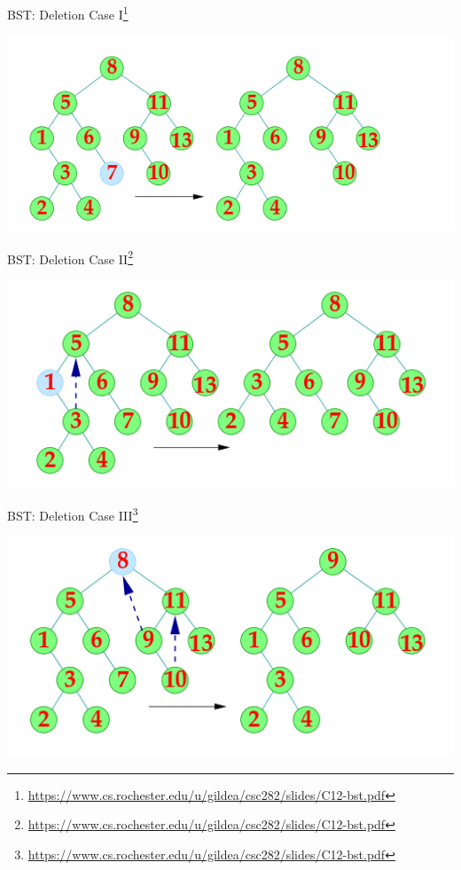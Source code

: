 \documentclass{beamer}
\newcommand{\furl}[1]{{\footnote{\url{#1}}}}
\begin{document}
\begin{frame}{BST: Deletion Case I\furl{https://www.cs.rochester.edu/u/gildea/csc282/slides/C12-bst.pdf}}
    \begin{center}
        \includegraphics[scale=0.6]{bstDelCase1.png}
    \end{center}
\end{frame}


\begin{frame}{BST: Deletion Case II\furl{https://www.cs.rochester.edu/u/gildea/csc282/slides/C12-bst.pdf}}
    \begin{center}
        \includegraphics[scale=0.6]{bstDelCase2.png}
    \end{center}
\end{frame}


\begin{frame}{BST: Deletion Case III\furl{https://www.cs.rochester.edu/u/gildea/csc282/slides/C12-bst.pdf}}
    \begin{center}
        \includegraphics[scale=0.6]{bstDelCase3.png}
    \end{center}
\end{frame}
\end{document}
